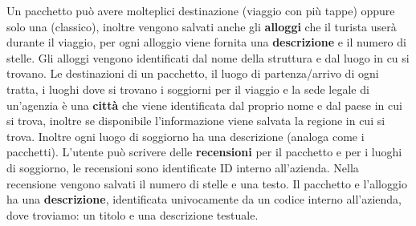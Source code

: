 %
%
Un pacchetto può avere molteplici destinazione (viaggio con più tappe) oppure solo una (classico), inoltre vengono salvati anche gli \textbf{alloggi} che il turista userà durante il viaggio, per ogni alloggio viene fornita una \textbf{descrizione} e il numero di stelle. Gli alloggi vengono identificati dal nome della struttura e dal luogo in cu si trovano.
%
%
Le destinazioni di un pacchetto, il luogo di partenza/arrivo di ogni tratta, i luoghi dove si trovano i soggiorni per il viaggio e la sede legale di un'agenzia è una \textbf{città} che viene identificata dal proprio nome e dal paese in cui si trova, inoltre se disponibile l'informazione viene salvata la regione in cui si trova. Inoltre ogni luogo di soggiorno ha una descrizione (analoga come i pacchetti).
%
%
L'utente può scrivere delle \textbf{recensioni} per il pacchetto e per i luoghi di soggiorno, le recensioni sono identificate ID interno all'azienda. Nella recensione vengono salvati il numero di stelle e una testo.
%
%
Il pacchetto e l'alloggio ha una \textbf{descrizione}, identificata univocamente da un codice interno all'azienda, dove troviamo: un titolo e una descrizione testuale.
%

